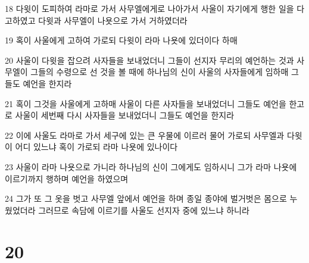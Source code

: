 \par 18 다윗이 도피하여 라마로 가서 사무엘에게로 나아가서 사울이 자기에게 행한 일을 다 고하였고 다윗과 사무엘이 나욧으로 가서 거하였더라
\par 19 혹이 사울에게 고하여 가로되 다윗이 라마 나욧에 있더이다 하매
\par 20 사울이 다윗을 잡으려 사자들을 보내었더니 그들이 선지자 무리의 예언하는 것과 사무엘이 그들의 수령으로 선 것을 볼 때에 하나님의 신이 사울의 사자들에게 임하매 그들도 예언을 한지라
\par 21 혹이 그것을 사울에게 고하매 사울이 다른 사자들을 보내었더니 그들도 예언을 한고로 사울이 세번째 다시 사자들을 보내었더니 그들도 예언을 한지라
\par 22 이에 사울도 라마로 가서 세구에 있는 큰 우물에 이르러 물어 가로되 사무엘과 다윗이 어디 있느냐 혹이 가로되 라마 나욧에 있나이다
\par 23 사울이 라마 나욧으로 가니라 하나님의 신이 그에게도 임하시니 그가 라마 나욧에 이르기까지 행하며 예언을 하였으며
\par 24 그가 또 그 옷을 벗고 사무엘 앞에서 예언을 하며 종일 종야에 벌거벗은 몸으로 누웠었더라 그러므로 속담에 이르기를 사울도 선지자 중에 있느냐 하니라

\chapter{20}

